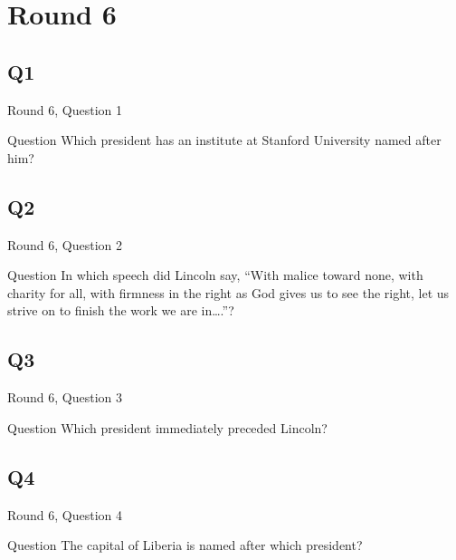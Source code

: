 \documentclass[11pt]{beamer}
\begin{document}
\def\thisSectionName{Presidents}
\section{Round 6}
    

\subsection*{Q1}
\begin{frame}[t]{Round 6, Question 1}
\vspace{0.5em}
\begin{block}{Question}
Which president has an institute at Stanford University named after him?
\end{block}
\end{frame}
    

\subsection*{Q2}
\begin{frame}[t]{Round 6, Question 2}
\vspace{0.5em}
\begin{block}{Question}
In which speech did Lincoln say, ``With malice toward none, with charity for all, with firmness in the right as God gives us to see the right, let us strive on to finish the work we are in\ldots{}.''?
\end{block}
\end{frame}
    

\subsection*{Q3}
\begin{frame}[t]{Round 6, Question 3}
\vspace{0.5em}
\begin{block}{Question}
Which president immediately preceded Lincoln?
\end{block}
\end{frame}
    

\subsection*{Q4}
\begin{frame}[t]{Round 6, Question 4}
\vspace{0.5em}
\begin{block}{Question}
The capital of Liberia is named after which president?
\end{block}
\end{frame}
    
\end{document}
